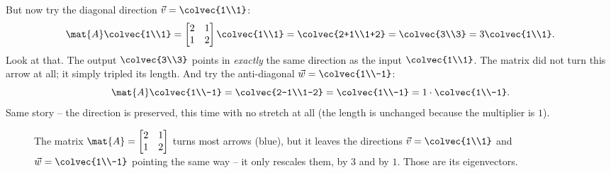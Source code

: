 But now try the diagonal direction $\vec{v}=\colvec{1\\1}$:
\[
  \mat{A}\colvec{1\\1}
  =\begin{bmatrix} 2 & 1 \\ 1 & 2 \end{bmatrix}\colvec{1\\1}
  =\colvec{2+1\\1+2}=\colvec{3\\3}=3\colvec{1\\1}.
\]
Look at that. The output $\colvec{3\\3}$ points in \emph{exactly} the same
direction as the input $\colvec{1\\1}$. The matrix did not turn this arrow at all;
it simply tripled its length. And try the anti-diagonal $\vec{w}=\colvec{1\\-1}$:
\[
  \mat{A}\colvec{1\\-1}
  =\colvec{2-1\\1-2}=\colvec{1\\-1}=1\cdot\colvec{1\\-1}.
\]
Same story -- the direction is preserved, this time with no stretch at all (the
length is unchanged because the multiplier is $1$).

\begin{figure}[H]
\centering
{}
\caption{The matrix $\mat{A}=\protect\begin{bmatrix}2&1\\1&2\protect\end{bmatrix}$
turns most arrows (blue), but it leaves the directions $\vec{v}=\colvec{1\\1}$ and
$\vec{w}=\colvec{1\\-1}$ pointing the same way -- it only rescales them, by $3$ and
by $1$. Those are its eigenvectors.}
\label{ch23:fig-eigendirections}
\end{figure}

